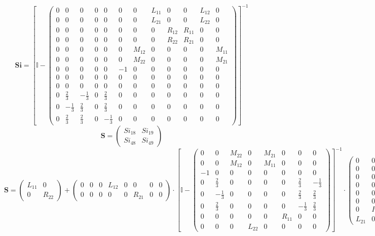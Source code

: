 \[ \mathbf{Si} = \left[ \mathbb{I}  - \left(\begin{smallmatrix} 0 & 0 & 0 & 0 & 0 & 0 & 0 & L_{11} & 0 & 0 & L_{12} & 0 \\ 0 & 0 & 0 & 0 & 0 & 0 & 0 & L_{21} & 0 & 0 & L_{22} & 0 \\ 0 & 0 & 0 & 0 & 0 & 0 & 0 & 0 & R_{12} & R_{11} & 0 & 0 \\ 0 & 0 & 0 & 0 & 0 & 0 & 0 & 0 & R_{22} & R_{21} & 0 & 0 \\ 0 & 0 & 0 & 0 & 0 & 0 & M_{12} & 0 & 0 & 0 & 0 & M_{11} \\ 0 & 0 & 0 & 0 & 0 & 0 & M_{22} & 0 & 0 & 0 & 0 & M_{21} \\ 0 & 0 & 0 & 0 & 0 & -1 & 0 & 0 & 0 & 0 & 0 & 0 \\ 0 & 0 & 0 & 0 & 0 & 0 & 0 & 0 & 0 & 0 & 0 & 0 \\ 0 & 0 & 0 & 0 & 0 & 0 & 0 & 0 & 0 & 0 & 0 & 0 \\ 0 & \frac{2}{3} & -\frac{1}{3} & 0 & \frac{2}{3} & 0 & 0 & 0 & 0 & 0 & 0 & 0 \\ 0 & -\frac{1}{3} & \frac{2}{3} & 0 & \frac{2}{3} & 0 & 0 & 0 & 0 & 0 & 0 & 0 \\ 0 & \frac{2}{3} & \frac{2}{3} & 0 & -\frac{1}{3} & 0 & 0 & 0 & 0 & 0 & 0 & 0 \end{smallmatrix}\right) \right]^{-1} \]
\[ \mathbf{S} = \left(\begin{smallmatrix} Si_{18} & Si_{19} \\ Si_{48} & Si_{49} \end{smallmatrix}\right) \]
\[ \mathbf{S} = \left(\begin{smallmatrix} L_{11} & 0 \\ 0 & R_{22} \end{smallmatrix}\right) + \left(\begin{smallmatrix} 0 & 0 & 0 & L_{12} & 0 & 0 & 0 & 0 \\ 0 & 0 & 0 & 0 & 0 & R_{21} & 0 & 0 \end{smallmatrix}\right) \cdot \left[ \mathbb{I}  - \left(\begin{smallmatrix} 0 & 0 & M_{22} & 0 & M_{21} & 0 & 0 & 0 \\ 0 & 0 & M_{12} & 0 & M_{11} & 0 & 0 & 0 \\ -1 & 0 & 0 & 0 & 0 & 0 & 0 & 0 \\ 0 & \frac{2}{3} & 0 & 0 & 0 & 0 & \frac{2}{3} & -\frac{1}{3} \\ 0 & -\frac{1}{3} & 0 & 0 & 0 & 0 & \frac{2}{3} & \frac{2}{3} \\ 0 & \frac{2}{3} & 0 & 0 & 0 & 0 & -\frac{1}{3} & \frac{2}{3} \\ 0 & 0 & 0 & 0 & 0 & R_{11} & 0 & 0 \\ 0 & 0 & 0 & L_{22} & 0 & 0 & 0 & 0 \end{smallmatrix}\right) \right]^{-1} \cdot\left(\begin{smallmatrix} 0 & 0 \\ 0 & 0 \\ 0 & 0 \\ 0 & 0 \\ 0 & 0 \\ 0 & 0 \\ 0 & R_{12} \\ L_{21} & 0 \end{smallmatrix}\right) \]
